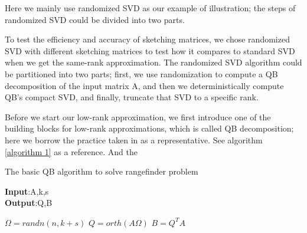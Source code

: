 \documentclass{article}
\begin{document}

Here we mainly use randomized SVD as our example of illustration; the steps of randomized SVD could be divided into two parts.  

To test the efficiency and accuracy of sketching matrices, we chose randomized SVD with different sketching matrices to test how it compares to standard SVD when we get the same-rank approximation. The randomized SVD algorithm could be partitioned into two parts; first, we use randomization to compute a QB decomposition of the input matrix A, and then we deterministically compute QB's compact SVD, and finally, truncate that SVD to a specific rank.



Before we start our low-rank approximation, we first introduce one of the building blocks for low-rank approximations, which is called QB decomposition; here we borrow the practice taken in \cite{yu2018efficientrandomizedalgorithmsfixedprecision} as a representative. See algorithm \ref{algorithm 1} as a reference. And the
\begin{algorithm}
	\caption{The basic QB algorithm to solve rangefinder problem} 
    \textbf{Input}:A,k,s\\
    \textbf{Output}:Q,B
	\begin{algorithmic}[1]
		\State$\Omega=randn(n,k+s)$
        \State$Q=orth(A\Omega)$
        \State$B=Q^TA$
	\end{algorithmic} 
    \label{algorithm 1}
\end{algorithm}
\end{document}

